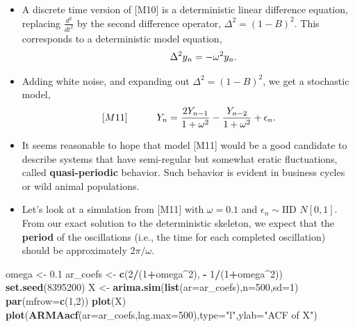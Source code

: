 \documentclass[]{article}
\newenvironment{Shaded}{\begin{snugshade}}{\end{snugshade}}
\newcommand{\KeywordTok}[1]{\textcolor[rgb]{0.13,0.29,0.53}{\textbf{#1}}}
\newcommand{\DataTypeTok}[1]{\textcolor[rgb]{0.13,0.29,0.53}{#1}}
\newcommand{\DecValTok}[1]{\textcolor[rgb]{0.00,0.00,0.81}{#1}}
\newcommand{\FloatTok}[1]{\textcolor[rgb]{0.00,0.00,0.81}{#1}}
\newcommand{\StringTok}[1]{\textcolor[rgb]{0.31,0.60,0.02}{#1}}
\newcommand{\OperatorTok}[1]{\textcolor[rgb]{0.81,0.36,0.00}{\textbf{#1}}}
\newcommand{\NormalTok}[1]{#1}
\begin{document}
\begin{itemize}
\item
  A discrete time version of {[}M10{]} is a deterministic linear
  difference equation, replacing \(\frac{d^2}{dt^2}\) by the second
  difference operator, \(\Delta^2 = (1-B)^2\). This corresponds to a
  deterministic model equation,
  \[\quad\quad\quad \Delta^2 y_n = - \omega^2 y_n.\]
\item
  Adding white noise, and expanding out \(\Delta^2 = (1-B)^2\), we get a
  stochastic model, $${[}M11{]}
  \quad\quad\quad Y_n = \frac{2Y_{n-1}}{1+\omega^2} - \frac{Y_{n-2}}{1+\omega^2} + \epsilon_n.$$
\item
  It seems reasonable to hope that model {[}M11{]} would be a good
  candidate to describe systems that have semi-regular but somewhat
  eratic fluctuations, called \textbf{quasi-periodic} behavior. Such
  behavior is evident in business cycles or wild animal populations.
\item
  Let's look at a simulation from {[}M11{]} with \(\omega=0.1\) and
  \(\epsilon_n\sim \mbox{IID } N[0,1]\). From our exact solution to the
  deterministic skeleton, we expect that the \textbf{period} of the
  oscillations (i.e., the time for each completed oscillation) should be
  approximately \(2\pi/\omega\).
\end{itemize}

\begin{Shaded}
\begin{Highlighting}[]
\NormalTok{omega <-}\StringTok{ }\FloatTok{0.1}
\NormalTok{ar_coefs <-}\StringTok{ }\KeywordTok{c}\NormalTok{(}\DecValTok{2}\OperatorTok{/}\NormalTok{(}\DecValTok{1}\OperatorTok{+}\NormalTok{omega}\OperatorTok{^}\DecValTok{2}\NormalTok{), }\OperatorTok{-}\StringTok{ }\DecValTok{1}\OperatorTok{/}\NormalTok{(}\DecValTok{1}\OperatorTok{+}\NormalTok{omega}\OperatorTok{^}\DecValTok{2}\NormalTok{))}
\KeywordTok{set.seed}\NormalTok{(}\DecValTok{8395200}\NormalTok{)}
\NormalTok{X <-}\StringTok{ }\KeywordTok{arima.sim}\NormalTok{(}\KeywordTok{list}\NormalTok{(}\DataTypeTok{ar=}\NormalTok{ar_coefs),}\DataTypeTok{n=}\DecValTok{500}\NormalTok{,}\DataTypeTok{sd=}\DecValTok{1}\NormalTok{)}
\KeywordTok{par}\NormalTok{(}\DataTypeTok{mfrow=}\KeywordTok{c}\NormalTok{(}\DecValTok{1}\NormalTok{,}\DecValTok{2}\NormalTok{))}
\KeywordTok{plot}\NormalTok{(X)}
\KeywordTok{plot}\NormalTok{(}\KeywordTok{ARMAacf}\NormalTok{(}\DataTypeTok{ar=}\NormalTok{ar_coefs,}\DataTypeTok{lag.max=}\DecValTok{500}\NormalTok{),}\DataTypeTok{type=}\StringTok{"l"}\NormalTok{,}\DataTypeTok{ylab=}\StringTok{"ACF of X"}\NormalTok{)}
\end{Highlighting}
\end{Shaded}
\end{document}
